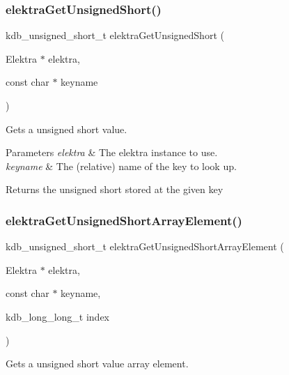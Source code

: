\subsubsection{\texorpdfstring{elektra\+Get\+Unsigned\+Short()}{elektraGetUnsignedShort()}}
{\footnotesize\ttfamily kdb\+\_\+unsigned\+\_\+short\+\_\+t elektra\+Get\+Unsigned\+Short (\begin{DoxyParamCaption}\item[{Elektra $\ast$}]{elektra,  }\item[{const char $\ast$}]{keyname }\end{DoxyParamCaption})}



Gets a unsigned short value. 


\begin{DoxyParams}{Parameters}
{\em elektra} & The elektra instance to use. \\
\hline
{\em keyname} & The (relative) name of the key to look up. \\
\hline
\end{DoxyParams}
\begin{DoxyReturn}{Returns}
the unsigned short stored at the given key 
\end{DoxyReturn}
\mbox{\label{group__highlevel_ga6a2f7bae625b970144b49ea42a2d5c00}} 
\subsubsection{\texorpdfstring{elektra\+Get\+Unsigned\+Short\+Array\+Element()}{elektraGetUnsignedShortArrayElement()}}
{\footnotesize\ttfamily kdb\+\_\+unsigned\+\_\+short\+\_\+t elektra\+Get\+Unsigned\+Short\+Array\+Element (\begin{DoxyParamCaption}\item[{Elektra $\ast$}]{elektra,  }\item[{const char $\ast$}]{keyname,  }\item[{kdb\+\_\+long\+\_\+long\+\_\+t}]{index }\end{DoxyParamCaption})}



Gets a unsigned short value array element. 



